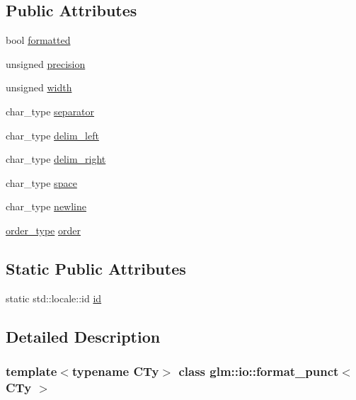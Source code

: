 \subsection*{Public Attributes}
\begin{DoxyCompactItemize}
\item 
bool \mbox{\hyperlink{classglm_1_1io_1_1format__punct_ab28088e6eef03fe4222fa8a5dd95288e}{formatted}}
\item 
unsigned \mbox{\hyperlink{classglm_1_1io_1_1format__punct_a5a15d396b7c963df9dec5e124236dc02}{precision}}
\item 
unsigned \mbox{\hyperlink{classglm_1_1io_1_1format__punct_a95d32ca2330bbf7c50d3e066b7a851db}{width}}
\item 
char\+\_\+type \mbox{\hyperlink{classglm_1_1io_1_1format__punct_ac561eb04fc2a1282ef38ea15f8e640ee}{separator}}
\item 
char\+\_\+type \mbox{\hyperlink{classglm_1_1io_1_1format__punct_ab1beed331269a39b06d17d02cf727d7c}{delim\+\_\+left}}
\item 
char\+\_\+type \mbox{\hyperlink{classglm_1_1io_1_1format__punct_a62fb1280404360463ec5af7144aa0949}{delim\+\_\+right}}
\item 
char\+\_\+type \mbox{\hyperlink{classglm_1_1io_1_1format__punct_adf9a915938727793de1daca07dcdfa4e}{space}}
\item 
char\+\_\+type \mbox{\hyperlink{classglm_1_1io_1_1format__punct_a8ddf8abdb0ebbdbb7eca08d7a777956e}{newline}}
\item 
\mbox{\hyperlink{namespaceglm_1_1io_a3497781803fe594a37177e05ab2a795f}{order\+\_\+type}} \mbox{\hyperlink{classglm_1_1io_1_1format__punct_a9de1f3b7120a036ec0ab394d2036d0aa}{order}}
\end{DoxyCompactItemize}
\subsection*{Static Public Attributes}
\begin{DoxyCompactItemize}
\item 
static std\+::locale\+::id \mbox{\hyperlink{classglm_1_1io_1_1format__punct_a763f60aeaecec9290917ed1d83b79838}{id}}
\end{DoxyCompactItemize}


\subsection{Detailed Description}
\subsubsection*{template$<$typename C\+Ty$>$\newline
class glm\+::io\+::format\+\_\+punct$<$ C\+Ty $>$}



